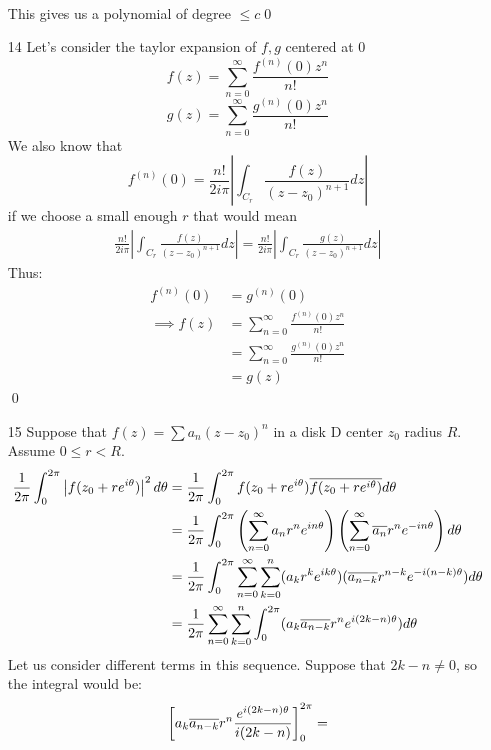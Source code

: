 \documentclass{article}
\begin{document}
\begin{enumerate}
\begin{align*}
      \end{align*}
      This gives us a polynomial of degree $\leq c$\qed
    \item[14]
      Let's consider the taylor expansion of $f,g$ centered at 0
      \[
        f(z)=\sum_{n=0}^\infty\frac{f^{(n)}(0)z^n}{n!}
      \]\[
        g(z)=\sum_{n=0}^\infty\frac{g^{(n)}(0)z^n}{n!}
      \]
      We also know that
      \[f^{(n)}(0)=\frac{n!}{2i\pi}\left|\int_{C_r}\frac{f(z)}{(z-z_0)^{n+1}}dz\right|\]
      if we choose a small enough $r$ that would mean
      \begin{align*}
        \frac{n!}{2i\pi}\left|\int_{C_r}\frac{f(z)}{(z-z_0)^{n+1}}dz\right|=\frac{n!}{2i\pi}\left|\int_{C_r}\frac{g(z)}{(z-z_0)^{n+1}}dz\right|
      \end{align*}
      Thus:
      \begin{align*}
        f^{(n)}(0)&=g^{(n)}(0)\\
        \implies f(z)&=\sum_{n=0}^\infty\frac{f^{(n)}(0)z^n}{n!}\\
        &=\sum_{n=0}^\infty\frac{g^{(n)}(0)z^n}{n!}\\
        &=g(z)
      \end{align*}\qed
    \item[15]
      Suppose that $f(z)=\sum a_n(z-z_0)^n$ in a disk D center $z_0$ radius $R$. Assume $0\leq r<R$.
      \begin{align*}
        \frac{1}{2\pi}\int_{0}^{2\pi}\left|f(z_0+re^{i\theta})\right|^2d\theta
        &=\frac{1}{2\pi}\int_{0}^{2\pi}
          f(z_0+re^{i\theta})
          \overline{f(z_0+re^{i\theta})}d\theta\\
        &=\frac{1}{2\pi}\int_{0}^{2\pi}
          \left(\sum_{n=0}^\infty a_nr^ne^{in\theta}\right)
          \left(\sum_{n=0}^\infty \overline{a_n}r^ne^{-in\theta}\right)d\theta\\
        &=\frac{1}{2\pi}\int_{0}^{2\pi}
          \sum_{n=0}^{\infty}\sum_{k=0}^{n}
          (a_kr^ke^{ik\theta})(\overline{a_{n-k}}r^{n-k}e^{-i(n-k)\theta})d\theta\\
        &=\frac{1}{2\pi}
          \sum_{n=0}^{\infty}\sum_{k=0}^{n}\int_{0}^{2\pi}
          (a_{k}\overline{a_{n-k}}r^ne^{i(2k-n)\theta})d\theta\\
      \end{align*}
      Let us consider different terms in this sequence. Suppose that $2k-n\neq0$, so the integral would be:
      \begin{align*}
        \left[a_{k}\con{a_{n-k}}r^n
        \frac{e^{i(2k-n)\theta}}{i(2k-n)}\right]_{0}^{2\pi}=

\end{align*}
\end{enumerate}
\end{document}
